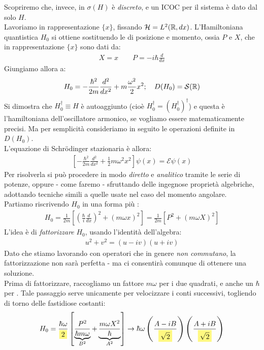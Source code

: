 \documentclass[../../FisicaTeorica.tex]{subfiles}
\begin{document}
Scopriremo che, invece, in \MQ $\sigma(H)$ è \textit{discreto}, e un ICOC per il sistema è dato dal solo $H$.\\
Lavoriamo in rappresentazione $\{x\}$, fissando $\mathcal{H}=L^2(\mathbb{R},dx)$. L'Hamiltoniana quantistica $H_0$ si ottiene sostituendo le  di posizione e momento, ossia $P$ e $X$, che in rappresentazione $\{x\}$ sono dati da:
\begin{align*}
X = x \qquad P=-i\hbar\frac{d}{dx}
\end{align*}
Giungiamo allora a:
\[
H_0 = -\frac{\hbar^2}{2m}\frac{d^2}{dx^2}+m\frac{\omega^2}{2}x^2; \quad D(H_0)=\mathcal{S}(\mathbb{R})
\]
Si dimostra che $H_0^\dag \equiv H$ è autoaggiunto (cioè $H_0^\dag = (H_0^\dag)^\dag$) e questa è l'hamiltoniana dell'oscillatore armonico, se vogliamo essere matematicamente precisi. Ma per semplicità consideriamo in seguito le operazioni definite in $D(H_0)$.\\ 
L'equazione di Schr\"odinger stazionaria è allora:
\begin{align*}
\left[-\frac{\hbar^2}{2m} \frac{d^2}{dx^2} + \frac{1}{2}m\omega^2 x^2\right]\psi(x) = \mathcal{E}\psi(x)
\end{align*}
Per risolverla si può procedere in modo \textit{diretto} e \textit{analitico} tramite le serie di potenze, oppure - come faremo - sfruttando delle ingegnose proprietà algebriche, adottando tecniche simili a quelle usate nel caso del momento angolare.\\
Partiamo riscrivendo $H_0$ in una forma più :
\begin{align*}
H_0 = \frac{1}{2m}\left[\left(\frac{\hbar}{i}\frac{d}{dx}\right)^2 + (m\omega x)^2 \right]=\frac{1}{2m}\left[P^2+(m\omega X)^2\right]
\end{align*}
L'idea è di \textit{fattorizzare} $H_0$, usando l'identità dell'algebra:
\begin{align*}
u^2+v^2 = (u-iv)(u+iv)
\end{align*}
Dato che stiamo lavorando con operatori che in genere \textit{non commutano}, la fattorizzazione non sarà perfetta - ma ci consentirà comunque di ottenere una soluzione.\\
Prima di fattorizzare, raccogliamo un fattore $m\omega$ per  i due quadrati, e anche un $\hbar$ per . Tale passaggio serve unicamente per velocizzare i conti successivi, togliendo di torno delle fastidiose costanti:
\begin{align*}
H_0 = \frac{\hbar\omega}{\hlc{Yellow}{2}}\left[\underbrace{\frac{P^2}{\hbar m\omega}}_{B^2} + \underbrace{\frac{m\omega X^2}{\hbar}}_{A^2}\right] \to \hbar \omega \left(\frac{A-iB}{\hlc{Yellow}{\sqrt{2}}}\right)\left(\frac{A+iB}{\hlc{Yellow}{\sqrt{2}}}\right)
\end{align*}
\end{document}
